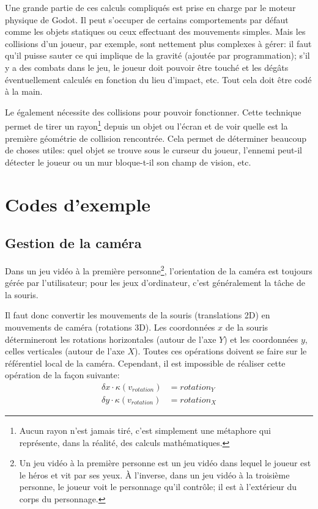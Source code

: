 Une grande partie de ces calculs compliqués est prise en charge par le moteur physique de Godot. Il peut s'occuper de certains comportements par défaut comme les objets statiques ou ceux effectuant des mouvements simples. Mais les collisions d'un joueur, par exemple, sont nettement plus complexes à gérer: il faut qu'il puisse sauter ce qui implique de la gravité (ajoutée par programmation); s'il y a des combats dans le jeu, le joueur doit pouvoir être touché et les dégâts éventuellement calculés en fonction du lieu d'impact, etc. Tout cela doit être codé à la main.

Le  également nécessite des collisions pour pouvoir fonctionner. Cette technique permet de tirer un rayon\footnote{Aucun rayon n'est jamais tiré, c'est simplement une métaphore qui représente, dans la réalité, des calculs mathématiques.} depuis un objet ou l'écran et de voir quelle est la première géométrie de collision rencontrée. Cela permet de déterminer beaucoup de choses utiles: quel objet se trouve sous le curseur du joueur, l'ennemi peut-il détecter le joueur ou un mur bloque-t-il son champ de vision, etc.



\section{Codes d'exemple}
\subsection{Gestion de la caméra}
Dans un jeu vidéo à la première personne\footnote{Un jeu vidéo à la première personne est un jeu vidéo dans lequel le joueur est  le héros et vit par ses yeux. À l'inverse, dans un jeu vidéo à la troisième personne, le joueur voit le personnage qu'il contrôle; il est à l'extérieur du corps du personnage.}, l'orientation de la caméra est toujours gérée par l'utilisateur; pour les jeux d'ordinateur, c'est généralement la tâche de la souris.

Il faut donc convertir les mouvements de la souris (translations 2D) en mouvements de caméra (rotations 3D). Les coordonnées $x$ de la souris détermineront les rotations horizontales (autour de l'axe $Y$) et les coordonnées $y$, celles verticales (autour de l'axe $X$). Toutes ces opérations doivent se faire sur le référentiel local de la caméra. Cependant, il est impossible de réaliser cette opération de la façon suivante:
\begin{align*}
		\delta x \cdot \kappa(v_{rotation}) &= rotation_Y\\
		\delta y \cdot \kappa(v_{rotation}) &= rotation_X
\end{align*}

